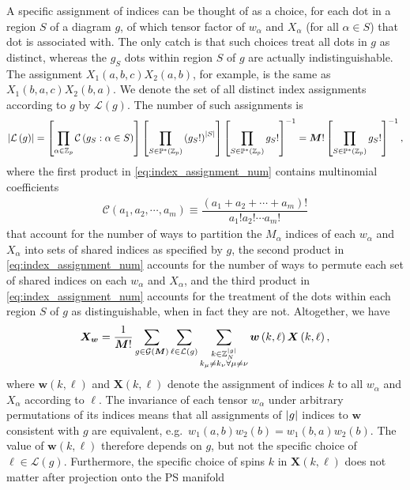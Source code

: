 \documentclass[nofootinbib,notitlepage,11pt]{revtex4-2}
\newcommand{\f}[2]{\dfrac{#1}{#2}} %
\newcommand{\p}[1]{\left(#1\right)} %
\renewcommand{\sp}[1]{\left[#1\right]} %
\newcommand{\m}{\bm} %
\newcommand{\1}{\mathds{1}}
\newcommand{\C}{\mathcal{C}}
\newcommand{\G}{\mathcal{G}}
\renewcommand{\L}{\mathcal{L}}
\newcommand{\PP}{\mathbb{P}}
\newcommand{\ZZ}{\mathbb{Z}}
\begin{document}
A specific assignment of indices can be thought of as a choice, for
each dot in a region $S$ of a diagram $g$, of which tensor factor of
$w_\alpha$ and $X_\alpha$ (for all $\alpha\in S$) that dot is
associated with.  The only catch is that such choices treat all dots
in $g$ as distinct, whereas the $g_S$ dots within region $S$ of $g$
are actually indistinguishable.  The assignment
$X_1\p{a,b,c} X_2\p{a,b}$, for example, is the same as
$X_1\p{b,a,c} X_2\p{b,a}$.  We denote the set of all distinct index
assignments according to $g$ by $\L\p{g}$.  The number of such
assignments is
\begin{align}
  \abs{\L\p{g}}
  = \sp{\prod_{\alpha\in\ZZ_p} \C\p{ g_S : \alpha\in S }}
  \sp{\prod_{S\in\PP^*\p{\ZZ_p}} \p{g_S!}^{\abs{S}}}
  \sp{\prod_{S\in\PP^*\p{\ZZ_p}} g_S!}^{-1}
  = \m M! \sp{\prod_{S\in\PP^*\p{\ZZ_p}} g_S!}^{-1},
  \label{eq:index_assignment_num}
\end{align}
where the first product in \eqref{eq:index_assignment_num} contains
multinomial coefficients
\begin{align}
  \C\p{a_1,a_2,\cdots,a_m}
  \equiv \f{\p{a_1+a_2+\cdots+a_m}!}{a_1!a_2!\cdots a_m!}
\end{align}
that account for the number of ways to partition the $M_\alpha$
indices of each $w_\alpha$ and $X_\alpha$ into sets of shared indices
as specified by $g$, the second product in
\eqref{eq:index_assignment_num} accounts for the number of ways to
permute each set of shared indices on each $w_\alpha$ and $X_\alpha$,
and the third product in \eqref{eq:index_assignment_num} accounts for
the treatment of the dots within each region $S$ of $g$ as
distinguishable, when in fact they are not.  Altogether, we have
\begin{align}
  \m X_{\m w}
  = \f1{\m M!} \sum_{g\in\G\p{\m M}} \sum_{\ell\in\L\p{g}}
  \sum_{\substack{k\in\ZZ_N^{\abs{g}}\\
      k_\mu\ne k_\nu\forall \mu\ne\nu}}
  \m w\p{k,\ell} \m X\p{k,\ell},
\end{align}
where $\m w\p{k,\ell}$ and $\m X\p{k,\ell}$ denote the assignment of
indices $k$ to all $w_\alpha$ and $X_\alpha$ according to $\ell$.  The
invariance of each tensor $w_\alpha$ under arbitrary permutations of
its indices means that all assignments of $\abs{g}$ indices to $\m w$
consistent with $g$ are equivalent,
e.g.~$w_1\p{a,b} w_2\p{b} = w_1\p{b,a} w_2\p{b}$.  The value of
$\m w\p{k,\ell}$ therefore depends on $g$, but not the specific choice
of $\ell\in\L\p{g}$.  Furthermore, the specific choice of spins $k$ in
$\m X\p{k,\ell}$ does not matter after projection onto the PS manifold
\end{document}
